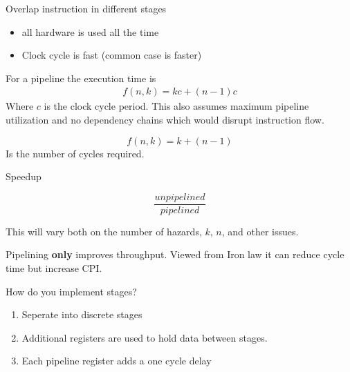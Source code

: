 \documentclass{report}
\begin{document}
\begin{description}
\begin{mdframed}
           Overlap instruction in different stages
           \begin{itemize}
               \item all hardware is used all the time
               \item Clock cycle is fast (common case is faster)
           \end{itemize}
        \end{mdframed}
        \begin{mdframed}
            For a pipeline the execution time is
            \begin{gather}
               f(n, k) = kc + (n-1)c 
            \end{gather}
            Where $c$ is the clock cycle period.
            This also assumes maximum pipeline utilization
            and no dependency chains which would disrupt
            instruction flow. 

            \begin{displaymath}
                f(n,k) = k + (n-1)
            \end{displaymath}
            Is the number of cycles required.
        \end{mdframed}
        \begin{center}
        \end{center}
    \item Speedup
        \begin{mdframed}
            \begin{displaymath}
                \frac{unpipelined}{pipelined}
            \end{displaymath}

            This will vary both on the number of hazards,
            $k$, $n$, and other issues.

            Pipelining \textbf{only} improves throughput.
            Viewed from Iron law it can reduce cycle
            time but increase CPI.
        \end{mdframed}
    \item How do you implement stages?
        \begin{mdframed}
            \begin{enumerate}
                \item Seperate into discrete stages
                \item Additional registers are used to hold
                    data between stages.
                \item Each pipeline register adds a one cycle
                    delay
            \end{enumerate}


\end{mdframed}
\end{description}
\end{document}

